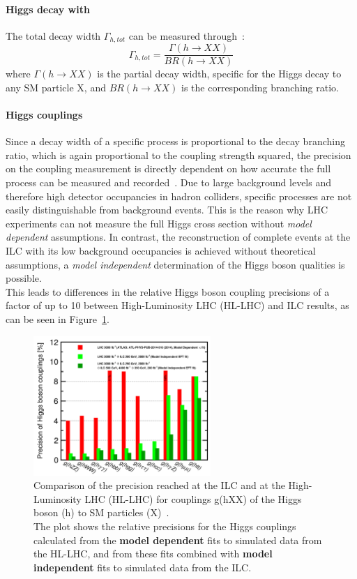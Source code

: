 \paragraph{Higgs decay with}
The total decay width $\Gamma_{h,tot}$ can be measured through~\cite[p. 14]{PhysicsCase}:
\begin{equation}
 \Gamma_{h,tot}=\frac{\Gamma(h\rightarrow XX)}{BR(h\rightarrow XX)}
\end{equation}
where $\Gamma(h\rightarrow XX)$ is the partial decay width, specific for the Higgs decay to any SM particle X, and $BR(h\rightarrow XX)$ is the corresponding branching ratio.

\paragraph{Higgs couplings}
Since a decay width of a specific process is proportional to the decay branching ratio, which is again proportional to the coupling strength squared, the precision on the coupling measurement is directly dependent on how accurate the full process can be measured and recorded~\cite{PhysicsCase}.
Due to large background levels and therefore high detector occupancies in hadron colliders, specific processes are not easily distinguishable from background events.
This is the reason why LHC experiments can not measure the full Higgs cross section without \textit{model dependent} assumptions.
In contrast, the reconstruction of complete events at the ILC with its low background occupancies is achieved without theoretical assumptions, a \textit{model independent} determination of the Higgs boson qualities is possible.\\
This leads to differences in the relative Higgs boson coupling precisions of a factor of up to 10 between High-Luminosity LHC (HL-LHC) and ILC results, as can be seen in Figure~\ref{fig:Higgs_couplings}.
\begin{figure}[h]
\centering
\includegraphics[width=0.6\textwidth]{Figures/Higgs_couplings.png}
\caption[Higgs coupling precisions]{Comparison of the precision reached at the ILC and at the High-Luminosity LHC (HL-LHC) for couplings g(hXX) of the Higgs boson (h) to SM particles (X)~\cite[p. 17]{PhysicsCase}.\\
The plot shows the relative precisions for the Higgs couplings calculated from the \textbf{model dependent} fits to simulated data from the HL-LHC, and from these fits combined with \textbf{model independent} fits to simulated data from the ILC.}
\label{fig:Higgs_couplings}
\end{figure}

